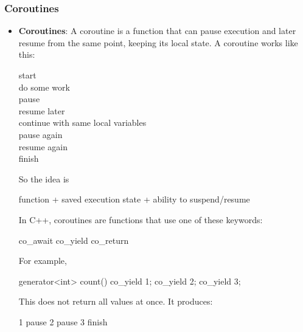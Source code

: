 \documentclass{report}
\begin{document}
        \subsubsection{Coroutines}
        \begin{itemize}
            \item \textbf{Coroutines}: A coroutine is a function that can pause execution and later resume from the same point, keeping its local state. 
                A coroutine works like this:
                \begin{center}
                    start \\
                    do some work \\
                    pause \\
                    resume later \\
                    continue with same local variables \\
                    pause again \\
                    resume again \\
                    finish
                \end{center}
                \bigbreak \noindent 
                So the idea is 
                \begin{center}
                    function + saved execution state + ability to suspend/resume
                \end{center}
                \bigbreak \noindent 
                In C++, coroutines are functions that use one of these keywords:
                \begin{cppcode}
                    co_await
                    co_yield
                    co_return
                \end{cppcode}
                \bigbreak \noindent 
                For example, 
                \bigbreak \noindent 
                \begin{cppcode}
                    generator<int> count() {
                        co_yield 1;
                        co_yield 2;
                        co_yield 3;
                    }
                \end{cppcode}
                \bigbreak \noindent 
                This does not return all values at once. It produces:
                \bigbreak \noindent 
                \begin{cppcode}
                    1
                    pause
                    2
                    pause
                    3
                    finish

\end{cppcode}
\end{itemize}
\end{document}
